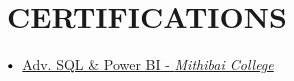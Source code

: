 \documentclass[letterpaper,11pt]{article}
\makeatletter
\newcommand{\resumeItem}[1]{
  \item\small{
    {#1 \vspace{-2pt}}
  }
}
\newcommand{\resumeSubheading}[4]{
  \vspace{-2pt}\item
    \begin{tabular*}{1.0\textwidth}[t]{l@{\extracolsep{\fill}}r}
      \textbf{\large#1} & \textbf{\small #2} \\
      \textit{\large#3} & \textit{\small #4} \\
     
    \end{tabular*}\vspace{-7pt}
}
\newcommand{\resumeSubHeadingListEnd}{\end{itemize}}
\newcommand{\resumeItemListStart}{\begin{itemize}}
\newcommand{\resumeItemListEnd}{\end{itemize}\vspace{-5pt}}
\newcommand\sbullet[1][.5]{\mathbin{\vcenter{\hbox{\scalebox{#1}{$\bullet$}}}}}
\makeatother
\begin{document}
            




 

\section{CERTIFICATIONS}

    $\sbullet[.75] \hspace{0.1cm}$ {\href{https://drive.google.com/file/d/134Av5jCJXgniiRaALymBmmRwpFkgKZkT/view?usp=sharing}{Adv. SQL \& Power BI - \textit{Mithibai College} \href{certificateLink.com}{\raisebox{-0.1\height}\faExternalLink }}} \hspace{1.6cm}




\end{document}
